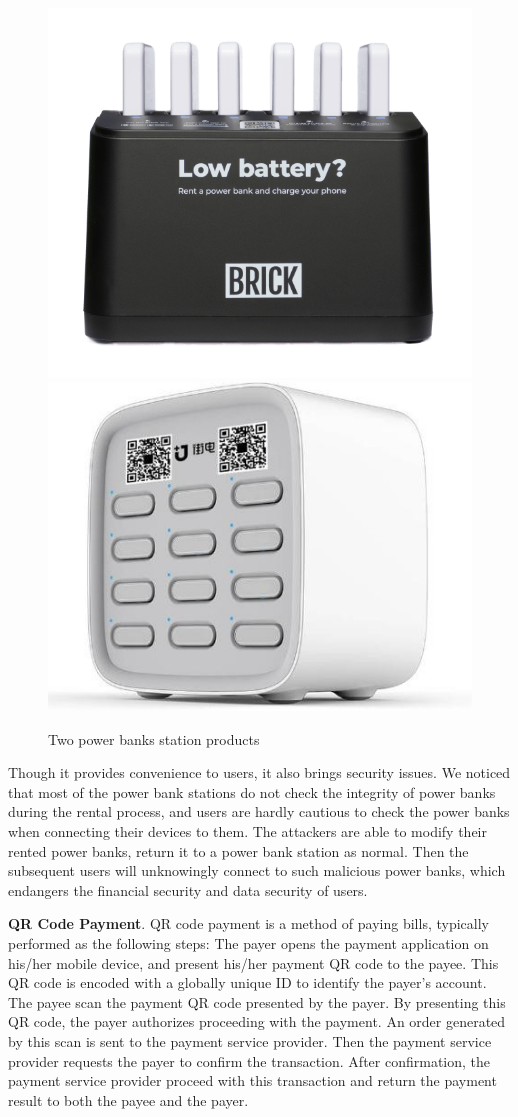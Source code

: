 \begin{figure}[t]
	\centering
	\includegraphics[width=.4 \linewidth]{./Figs/Brick_station.png}
	\includegraphics[width=.4 \linewidth]{./Figs/jiedian.jpg}
	\caption{Two power banks station products}
	\label{fig:PBS_products}
\end{figure}



Though it provides convenience to users, it also brings security issues. 
We noticed that most of the power bank stations do not check the integrity of power banks during the rental process, and users are hardly cautious to check the power banks when connecting their devices to them. 
The attackers are able to modify their rented power banks, return it to a power bank station as normal.
Then the subsequent users will unknowingly connect to such malicious power banks, which endangers the financial security and data security of users.


\textbf{QR Code Payment}. 
QR code payment is a method of paying bills, typically performed as the following steps:
 The payer opens the payment application on his/her mobile device, and present his/her payment QR code to the payee. 
This QR code is encoded with a globally unique ID to identify the payer's account. 
 The payee scan the payment QR code presented by the payer. 
By presenting this QR code, the payer authorizes proceeding with the payment.
 An order generated by this scan is sent to the payment service provider. 
Then the payment service provider requests the payer to confirm the transaction.
 After confirmation, the payment service provider proceed with this transaction and return the payment result to both the payee and the payer.

